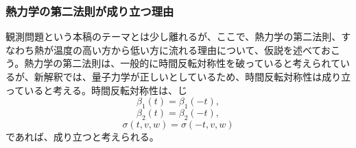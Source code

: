 \subsubsection{熱力学の第二法則が成り立つ理由}
観測問題という本稿のテーマとは少し離れるが、ここで、熱力学の第二法則、すなわち熱が温度の高い方から低い方に流れる理由について、仮説を述べておこう。熱力学の第二法則は、一般的に時間反転対称性を破っていると考えられているが、新解釈では、量子力学が正しいとしているため、時間反転対称性は成り立っていると考える。時間反転対称性は、じ
\begin{equation}
    \beta_1(t) = \beta_1(-t),
\end{equation}
\begin{equation}
    \beta_2(t) = \beta_2(-t),
\end{equation}
\begin{equation}
    \sigma(t,v,w) = \sigma(-t,v,w)
\end{equation}
であれば、成り立つと考えられる。

